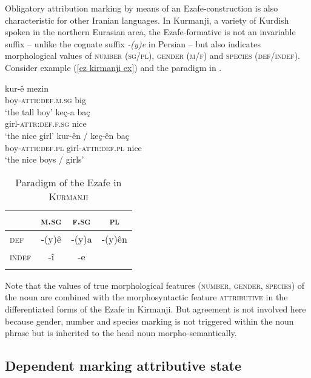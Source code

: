 Obligatory attribution marking by means of an Ezafe-construction is also characteristic for other Iranian languages. In Kurmanji, a variety of Kurdish spoken in the northern Eurasian area, the Ezafe-formative is not an invariable suffix – unlike the cognate suffix \textit{-(y)e} in Persian – but also indicates morphological values of \textsc{number} (\textsc{sg\fshyp{}pl}), \textsc{gender} (\textsc{m\fshyp{}f}) and \textsc{species} (\textsc{def\fshyp{}indef}). Consider example (\ref{ez kirmanji ex}) and the paradigm in . 
\begin{exe}
\ex
{} \label{ez kirmanji ex}%
\begin{xlist}
\ex
\gll	kur-\^e mezin\\
	boy-\textsc{attr:def.m.sg} big\\
\glt	‘the tall boy’
\ex	
\gll	ke\c{c}-a ba\c{c}\\
	girl-\textsc{attr:def.f.sg} nice\\
\glt	‘the nice girl’
\ex	
\gll	kur-\^en / ke\c{c}-\^en ba\c{c}\\
	boy-\textsc{attr:def.pl} {} girl-\textsc{attr:def.pl} nice\\
\glt	‘the nice boys / girls’ %
\end{xlist}
\end{exe}
\begin{table}
\begin{tabular}{l | ccc}
\lsptoprule
		&\textsc{m.sg}	&\textsc{f.sg}		&\textsc{pl}\\
\midrule
\textsc{def}	&-(y)\^{e}	&-(y)a			&-(y)\^{e}n\\
\textsc{indef}	&-î		&-e				&\\
\lspbottomrule
\end{tabular}
\caption[Paradigm of the Ezafe in \textsc{Kurmanji}]{Paradigm of the Ezafe in \textsc{Kurmanji} \citep{schroder2002}} 
\label{ez kirmanji paradigm}
\end{table}
Note that the values of true morphological features (\textsc{number, gender, species}) of the noun are combined with the morphosyntactic feature \textsc{attributive} in the differentiated forms of the Ezafe in Kirmanji. But agreement is not involved here because gender, number and species marking is not triggered within the noun phrase but is inherited to the head noun morpho-semantically.

\subsection{Dependent marking attributive state}\label{dep-marking state}

